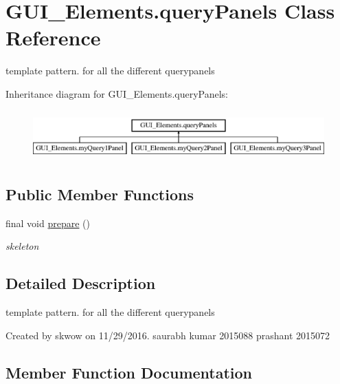 \hypertarget{class_g_u_i___elements_1_1query_panels}{}\section{G\+U\+I\+\_\+\+Elements.\+query\+Panels Class Reference}
\label{class_g_u_i___elements_1_1query_panels}


template pattern. for all the different querypanels  


Inheritance diagram for G\+U\+I\+\_\+\+Elements.\+query\+Panels\+:\begin{figure}[H]
\begin{center}
\leavevmode
\includegraphics[height=1.944445cm]{class_g_u_i___elements_1_1query_panels}
\end{center}
\end{figure}
\subsection*{Public Member Functions}
\begin{DoxyCompactItemize}
\item 
final void \hyperlink{class_g_u_i___elements_1_1query_panels_accb5dae53ed500cf39ba1ce8833029fc}{prepare} ()
\begin{DoxyCompactList}\small\item\em skeleton \end{DoxyCompactList}\end{DoxyCompactItemize}


\subsection{Detailed Description}
template pattern. for all the different querypanels 

Created by skwow on 11/29/2016. saurabh kumar 2015088 prashant 2015072 

\subsection{Member Function Documentation}
\hypertarget{class_g_u_i___elements_1_1query_panels_accb5dae53ed500cf39ba1ce8833029fc}{}\label{class_g_u_i___elements_1_1query_panels_accb5dae53ed500cf39ba1ce8833029fc} 
